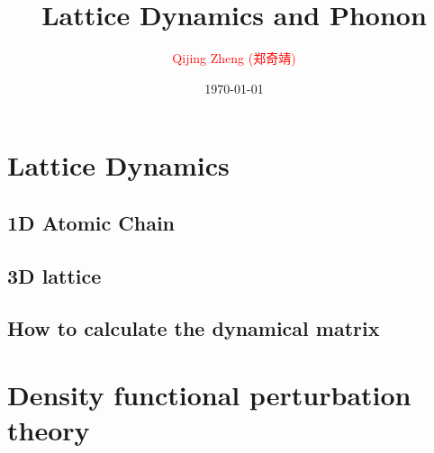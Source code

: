 \documentclass[8pt,dvipsnames]{beamer}
\title[]{
  Lattice Dynamics and Phonon
}
\author[Q.J. Zheng]{
  \textcolor{red}{Qijing Zheng (郑奇靖)} \\
}
\institute[D.P. USTC]{
  \smallskip
  \texttt{[image: logo.jpg]}\\
  \texttt{zqj@ustc.edu.cn} \\
  \medskip
  Department of Physics \\
  \medskip
  University of Science \& Technology of China \\
}
\date{\today}
\begin{document}

% 

\section{Lattice Dynamics}

\subsection{1D Atomic Chain}








\subsection{3D lattice}







\subsection{How to calculate the dynamical matrix}






\section{Density functional perturbation theory}







\end{document}
